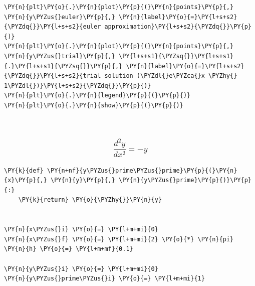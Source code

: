     \begin{tcolorbox}[breakable, size=fbox, boxrule=1pt, pad at break*=1mm,colback=cellbackground, colframe=cellborder]
\begin{Verbatim}[commandchars=\\\{\}]
\PY{n}{plt}\PY{o}{.}\PY{n}{plot}\PY{p}{(}\PY{n}{points}\PY{p}{,} \PY{n}{y\PYZus{}euler}\PY{p}{,} \PY{n}{label}\PY{o}{=}\PY{l+s+s2}{\PYZdq{}}\PY{l+s+s2}{euler approximation}\PY{l+s+s2}{\PYZdq{}}\PY{p}{)}
\PY{n}{plt}\PY{o}{.}\PY{n}{plot}\PY{p}{(}\PY{n}{points}\PY{p}{,} \PY{n}{y\PYZus{}trial}\PY{p}{,} \PY{l+s+s1}{\PYZsq{}}\PY{l+s+s1}{.}\PY{l+s+s1}{\PYZsq{}}\PY{p}{,} \PY{n}{label}\PY{o}{=}\PY{l+s+s2}{\PYZdq{}}\PY{l+s+s2}{trial solution (\PYZdl{}e\PYZca{}x \PYZhy{} 1\PYZdl{})}\PY{l+s+s2}{\PYZdq{}}\PY{p}{)}
\PY{n}{plt}\PY{o}{.}\PY{n}{legend}\PY{p}{(}\PY{p}{)}
\PY{n}{plt}\PY{o}{.}\PY{n}{show}\PY{p}{(}\PY{p}{)}
\end{Verbatim}
\end{tcolorbox}

    \begin{center}
    \end{center}
    { \hspace*{\fill} \\}
    
    \hypertarget{fracd2ydx2--y}{%
\subsubsection{\texorpdfstring{\[\frac{d^2y}{dx^2} = -y\]}{\textbackslash frac\{d\^{}2y\}\{dx\^{}2\} = -y}}\label{fracd2ydx2--y}}

    \begin{tcolorbox}[breakable, size=fbox, boxrule=1pt, pad at break*=1mm,colback=cellbackground, colframe=cellborder]
\begin{Verbatim}[commandchars=\\\{\}]
\PY{k}{def} \PY{n+nf}{y\PYZus{}prime\PYZus{}prime}\PY{p}{(}\PY{n}{x}\PY{p}{,} \PY{n}{y}\PY{p}{,} \PY{n}{y\PYZus{}prime}\PY{p}{)}\PY{p}{:}
    \PY{k}{return} \PY{o}{\PYZhy{}}\PY{n}{y}


\PY{n}{x\PYZus{}i} \PY{o}{=} \PY{l+m+mi}{0}
\PY{n}{x\PYZus{}f} \PY{o}{=} \PY{l+m+mi}{2} \PY{o}{*} \PY{n}{pi}
\PY{n}{h} \PY{o}{=} \PY{l+m+mf}{0.1}

\PY{n}{y\PYZus{}i} \PY{o}{=} \PY{l+m+mi}{0}
\PY{n}{y\PYZus{}prime\PYZus{}i} \PY{o}{=} \PY{l+m+mi}{1}
\end{Verbatim}
\end{tcolorbox}

